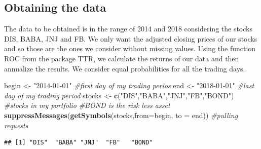 \documentclass[]{article}
\newenvironment{Shaded}{\begin{snugshade}}{\end{snugshade}}
\newcommand{\KeywordTok}[1]{\textcolor[rgb]{0.13,0.29,0.53}{\textbf{#1}}}
\newcommand{\DataTypeTok}[1]{\textcolor[rgb]{0.13,0.29,0.53}{#1}}
\newcommand{\StringTok}[1]{\textcolor[rgb]{0.31,0.60,0.02}{#1}}
\newcommand{\CommentTok}[1]{\textcolor[rgb]{0.56,0.35,0.01}{\textit{#1}}}
\newcommand{\NormalTok}[1]{#1}
\begin{document}
\subsection{Obtaining the data}\label{obtaining-the-data}

The data to be obtained is in the range of 2014 and 2018 considering the
stocks DIS, BABA, JNJ and FB. We only want the adjusted closing prices
of our stocks and so those are the ones we consider without missing
values. Using the function ROC from the package TTR, we calculate the
returns of our data and then annualize the results. We consider equal
probabilities for all the trading days.

\begin{Shaded}
\begin{Highlighting}[]
\NormalTok{begin <-}\StringTok{ "2014-01-01"} \CommentTok{#first day of my trading perios}
\NormalTok{end <-}\StringTok{ "2018-01-01"} \CommentTok{#last day of my trading period}
\NormalTok{stocks <-}\StringTok{ }\KeywordTok{c}\NormalTok{(}\StringTok{"DIS"}\NormalTok{,}\StringTok{"BABA"}\NormalTok{,}\StringTok{"JNJ"}\NormalTok{,}\StringTok{"FB"}\NormalTok{,}\StringTok{"BOND"}\NormalTok{) }\CommentTok{#stocks in my portfolio}
\CommentTok{#BOND is the risk less asset}
\KeywordTok{suppressMessages}\NormalTok{(}\KeywordTok{getSymbols}\NormalTok{(stocks,}\DataTypeTok{from=}\NormalTok{begin, }\DataTypeTok{to =}\NormalTok{ end)) }\CommentTok{#pulling requests}
\end{Highlighting}
\end{Shaded}

\begin{verbatim}
## [1] "DIS"  "BABA" "JNJ"  "FB"   "BOND"
\end{verbatim}
\end{document}
